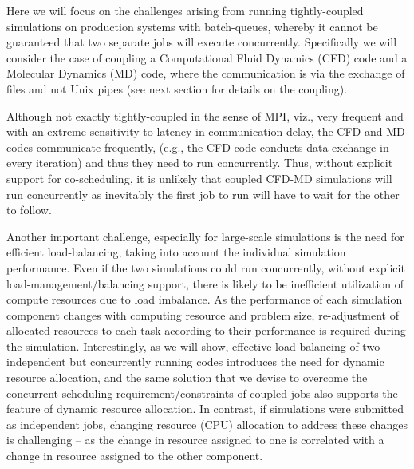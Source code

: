 \documentclass[conference,final]{IEEEtran}
\newcommand{\jhanote}[1]{ {\textcolor{red} { ***Jha: #1 }}}
\newcommand{\jhanote}[1]{}
\begin{document}
Here we will focus on the challenges arising from running
tightly-coupled simulations on production systems with batch-queues,
whereby it cannot be guaranteed that two separate jobs will execute
concurrently. Specifically we will consider the case of coupling a
Computational Fluid Dynamics (CFD) code and a Molecular Dynamics (MD)
code, where the communication is via the exchange of files and not
Unix pipes (see next section for details on the coupling).


Although not exactly tightly-coupled in the sense of MPI, viz., very
frequent and with an extreme sensitivity to latency in communication
delay, the CFD and MD codes communicate frequently, (e.g., the CFD
code conducts data exchange in every iteration) and thus they need to
run concurrently. Thus, without explicit support for co-scheduling, it
is unlikely that coupled CFD-MD simulations will run concurrently as
inevitably the first job to run will have to wait for the other to
follow.


Another important challenge, especially for large-scale simulations is
the need for efficient load-balancing, taking into account the
individual simulation performance. Even if the two simulations could
run concurrently, without explicit load-management/balancing support,
there is likely to be inefficient utilization of compute resources due
to load imbalance. As the performance of each simulation component
changes with computing resource and problem size, re-adjustment of
allocated resources to each task according to their performance is
required during the simulation. Interestingly, as we will show,
effective load-balancing of two independent but concurrently running
codes introduces the need for dynamic resource allocation, and the
same solution that we devise to overcome the concurrent scheduling
requirement/constraints of coupled jobs also supports the feature of
dynamic resource allocation. In contrast, if simulations were
submitted as independent jobs, changing resource (CPU) allocation to
address these changes is challenging -- as the change in resource
assigned to one is correlated with a change in resource assigned to
the other component.
\end{document}
